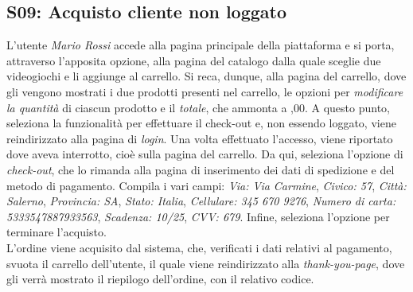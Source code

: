 \documentclass[12pt, a4paper, oneside]{book}
\begin{document}
    \subsection*{S09: Acquisto cliente non loggato}
        L'utente \textit{Mario Rossi} accede alla pagina principale della piattaforma e si porta, attraverso l'apposita opzione, alla pagina
        del catalogo dalla quale sceglie due videogiochi e li aggiunge al carrello. Si reca, dunque, alla pagina del carrello, dove gli vengono mostrati i due prodotti presenti
        nel carrello, le opzioni per \textit{modificare la quantità} di ciascun prodotto e il \textit{totale}, che ammonta a ,00. A questo punto, seleziona la funzionalità
        per effettuare il check-out e, non essendo loggato, viene reindirizzato alla pagina di \textit{login}. Una volta effettuato l'accesso, viene riportato dove aveva
        interrotto, cioè sulla pagina del carrello.
        Da qui, seleziona l'opzione di \textit{check-out}, che lo rimanda alla pagina di inserimento dei dati di spedizione e del metodo di pagamento. Compila i vari campi:
        \textit{Via: Via Carmine}, \textit{Civico: 57}, \textit{Città: Salerno}, \textit{Provincia: SA}, \textit{Stato: Italia}, \textit{Cellulare: 345 670 9276},
        \textit{Numero di carta: 5333547887933563}, \textit{Scadenza: 10/25}, \textit{CVV: 679}. Infine, seleziona l'opzione per terminare l'acquisto.\\
        L'ordine viene acquisito dal sistema, che, verificati i dati relativi al pagamento, svuota il carrello dell'utente, il quale viene
        reindirizzato alla \textit{thank-you-page}, dove gli verrà mostrato il riepilogo dell'ordine, con il relativo codice.
\end{document}
